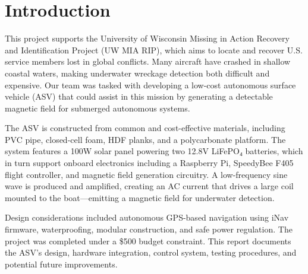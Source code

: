 \section{Introduction}

This project supports the University of Wisconsin Missing in Action Recovery and Identification Project (UW MIA RIP), which aims to locate and recover U.S. service members lost in global conflicts. Many aircraft have crashed in shallow coastal waters, making underwater wreckage detection both difficult and expensive. Our team was tasked with developing a low-cost autonomous surface vehicle (ASV) that could assist in this mission by generating a detectable magnetic field for submerged autonomous systems.

The ASV is constructed from common and cost-effective materials, including PVC pipe, closed-cell foam, HDF planks, and a polycarbonate platform. The system features a 100W solar panel powering two 12.8V LiFePO₄ batteries, which in turn support onboard electronics including a Raspberry Pi, SpeedyBee F405 flight controller, and magnetic field generation circuitry. A low-frequency sine wave is produced and amplified, creating an AC current that drives a large coil mounted to the boat—emitting a magnetic field for underwater detection.

Design considerations included autonomous GPS-based navigation using iNav firmware, waterproofing, modular construction, and safe power regulation. The project was completed under a \$500 budget constraint. This report documents the ASV’s design, hardware integration, control system, testing procedures, and potential future improvements.